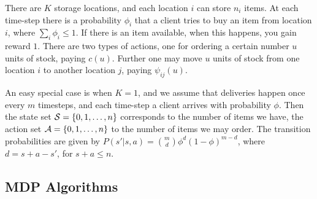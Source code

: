 \begin{example}
  There are $K$ storage locations, and each location $i$ can store
  $n_i$ items.  At each time-step there is a probability $\phi_i$ that
  a client tries to buy an item from location $i$, where $\sum_i
  \phi_i \leq 1$.  If there is an item available, when this happens,
  you gain reward $1$.  There are two types of actions, one for
  ordering a certain number $u$ units of stock, paying $c(u)$.
  Further one may move $u$ units of stock from one location $i$ to
  another location $j$, paying $\psi_{ij}(u)$.
\end{example}

An easy special case is when $K=1$, and we assume that deliveries
happen once every $m$ timesteps, and each time-step a client arrives
with probability $\phi$.  Then the state set ${\mathcal{S}}=\{0, 1, \ldots, n
\}$ corresponds to the number of items we have, the action set
${\mathcal{A}}=\{0, 1, \ldots, n\}$ to the number of items we may order.  The
transition probabilities are given by $P(s'|s,a) =
\binom{m}{d}\phi^d(1-\phi)^{m-d}$, where $d=s+a-s'$, for $s+a \leq n$.


\newcommand{\Node}[3]{%
  \pgfnodecircle{#1}[stroke]{#2}{0.3cm}%
  \pgfputat{\pgfrelative{#2}{\pgfxy(0,-.075)}}{\pgfbox[center,base]{#3}}}

\newcommand{\SNode}[3]{%
  \pgfnodebox{#1}[stroke]{#2}{0.3cm}%
  \pgfputat{\pgfrelative{#2}{\pgfxy(0,-.075)}}{\pgfbox[center,base]{#3}}}

\newcommand{\BNode}[3]{%
  \pgfnodecircle{#1}[stroke]{#2}{0.4cm}%
  \pgfputat{\pgfrelative{#2}{\pgfxy(0,-.075)}}{\pgfbox[center,base]{#3}}}

\newcommand{\Claim}[2]{%
  \pgfputat{\pgfrelative{\pgfxy(0.4,-0.075)}{\pgfnodecenter{#1}}}%
  {\pgfbox[left,base]{#2}}}

\newcommand{\LClaim}[2]{%
  \pgfputat{\pgfrelative{\pgfxy(-0.4,-0.075)}{\pgfnodecenter{#1}}}%
  {\pgfbox[right,base]{#2}}}

\newcommand{\Bush}[3]{%
  \pgfnodecircle{#1}[virtual]{\pgfrelative{\pgfnodecenter{#2}}{#3}}{1pt}%
  \pgfnodeconnline{#2}{#1}}



\subsection{MDP Algorithms}
\label{sec:mdp-algorithms}
